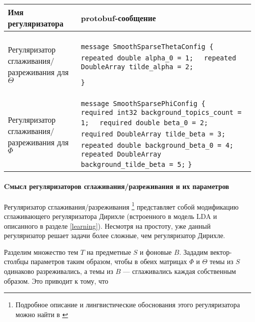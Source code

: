 \begin{tabular}[t]{|p{14em}|p{26em}|}
\hline
\vspace{2pt} \textbf{Имя регуляризатора} \vspace{4pt} &
\vspace{2pt} \textbf{protobuf-сообщение} \vspace{4pt} \\

\hline
\vspace{4pt}

Регуляризатор сглаживания/ разреживания для $\Theta$ & 
\vspace{4pt}

\verb|message SmoothSparseThetaConfig {|
\verb|  repeated double alpha_0 = 1;|
\verb|  repeated DoubleArray tilde_alpha = 2;|

\verb|}|
\vspace{4pt}

\\
\hline
\vspace{4pt}

Регуляризатор сглаживания/ разреживания для $\Phi$ &
\vspace{4pt}

\verb|message SmoothSparsePhiConfig {|
\verb|  required int32 background_topics_count = 1;|
\verb|  required double beta_0 = 2;|
\verb|  required DoubleArray tilde_beta = 3;|
\verb|  repeated double background_beta_0 = 4;|
\verb|  repeated DoubleArray background_tilde_beta = 5;|
\verb|}|
\vspace{4pt}

\\
\hline
\end{tabular}

\paragraph{Cмысл регуляризаторов сглаживания/разреживания и их параметров}

Регуляризатор сглаживания/разреживания
\footnote{Подробное описание и лингвистические обоснования этого регуляризатора можно найти в \cite{voron_potap_14}}
 представляет собой модификацию сглаживающего регуляризатора Дирихле (встроенного в модель LDA и описанного в разделе \ref{learning}). Несмотря на простоту, уже данный регуляризатор решает задачи более сложные, чем регуляризатор Дирихле.

Разделим множество тем $T$ на предметные $S$ и фоновые $B$. Зададим вектор-столбцы параметров таким образом, чтобы в обеих матрицах $\Phi$ и $\Theta$ темы из $S$ одинаково разреживались, а темы из $B$ --- сглаживались каждая собственным образом. Это приводит к тому, что 

